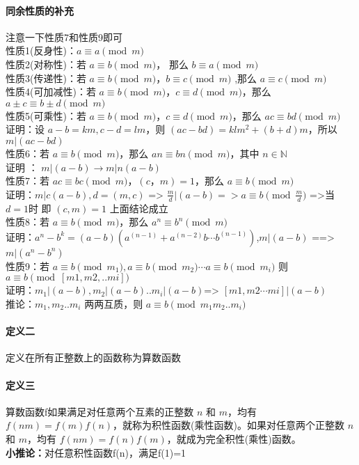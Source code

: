 	\paragraph{同余性质的补充}注意一下性质7和性质9即可\\
	性质1(反身性)：$a\equiv a\pmod m$\\
	性质2(对称性)：若 $a\equiv b\pmod m$， 那么 $b\equiv a\pmod m$\\
	性质3(传递性)：若 $a\equiv b\pmod m$，$b\equiv c\pmod m$ ,那么 $a\equiv c\pmod m$\\
	性质4(可加减性)：若 $a\equiv b\pmod m$，$c\equiv d\pmod m$，那么 $a\pm c\equiv b\pm d\pmod m$\\
	性质5(可乘性)：若 $a\equiv b\pmod m$，$c\equiv d\pmod m$，那么 $ac\equiv bd\pmod m$\\
	证明：设 $a-b=km,c-d=lm$，则 $(ac-bd)=klm^2+(b+d)m$，所以$m|(ac-bd)$\\
	性质6：若 $a\equiv b\pmod m$，那么 $an\equiv bn\pmod m$，其中 $n\in \mathbb{N}$\\
	证明 ： $m|(a-b)\to m|n(a-b)$\\
	性质7：若 $ac\equiv bc\pmod m$，$(c，m)=1$，那么 $a\equiv b\pmod m$\\
	证明：$m|c(a-b),d=(m,c)$ => $\frac{m}{d}|(a-b) => a\equiv b\pmod{\frac{m}{d}}$ =>当 $d=1 $时 即 $(c,m)=1$ 上面结论成立\\
	性质8：若 $a\equiv b\pmod m$，那么 $a^n\equiv b^n\pmod m$\\
	证明：$a^n-b^k=(a-b)(a^(n-1)+a^(n-2)b\cdots b^(n-1))$,$m|(a-b)$ ==> $m|(a^n-b^n)$\\
	性质9：若 $a\equiv b\pmod {m_1},a\equiv b\pmod {m_2}\cdots a\equiv b\pmod {m_i}$ 则 $a\equiv b\pmod{[m1,m2,..mi]}$\\
	证明：$m_1 |(a-b),m_2|(a-b) ..m_i|(a-b)$=> $[m1,m2\cdots mi]|(a-b)$\\
	推论：$m_1,m_2..m_i$ 两两互质，则 $a\equiv b\pmod{m_1m_2..m_i}$\\
	\paragraph{定义二}定义在所有正整数上的函数称为算数函数\\
	\paragraph{定义三}算数函数f如果满足对任意两个互素的正整数 $n$ 和 $m$，均有 $f(nm)=f(m)f(n)$，就称为积性函数(乘性函数)。如果对任意两个正整数 $n$ 和 $m$，均有 $f(nm)=f(n)f(m)$，就成为完全积性(乘性)函数。\\
	\textbf{小推论：}对任意积性函数f(n)，满足f(1)=1\\
